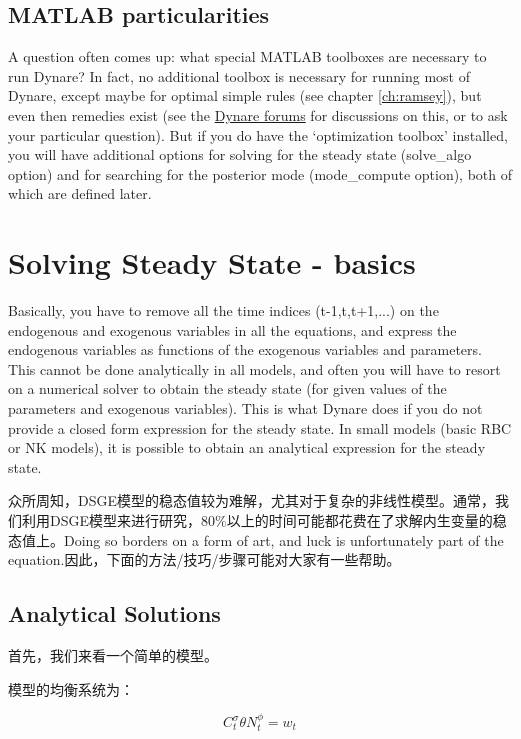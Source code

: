 \documentclass[cn,10pt,math=newtx,citestyle=gb7714-2015,bibstyle=gb7714-2015]{elegantbook}
\begin{document}
	\section{MATLAB particularities}
	
	A question often comes up: what special MATLAB toolboxes are necessary to run Dynare? In fact, no additional toolbox is necessary for running most of Dynare, except maybe for optimal simple rules (see chapter \ref{ch:ramsey}), but even then remedies exist (see the \href{http://www.dynare.org/phpBB3}{Dynare forums} for discussions on this, or to ask your particular question). But if you do have the `optimization toolbox' installed, you will have additional options for solving for the steady state (solve\_algo option) and for searching for the posterior mode (mode\_compute option), both of which are defined later. 
	
	\chapter{Solving Steady State - basics}
	Basically, you have to remove all the time indices (t-1,t,t+1,...) on the endogenous and exogenous variables in all the equations, and express the endogenous variables as functions of the exogenous variables and parameters. This cannot be done analytically in all models, and often you will have to resort on a numerical solver to obtain the steady state (for given values of the parameters and exogenous variables). This is what Dynare does if you do not provide a closed form expression for the steady state. In small models (basic RBC or NK models), it is possible to obtain an analytical expression for the steady state.
	
	众所周知，DSGE模型的稳态值较为难解，尤其对于复杂的非线性模型。通常，我们利用DSGE模型来进行研究，$80\%$以上的时间可能都花费在了求解内生变量的稳态值上。Doing so borders on a form of art, and luck is unfortunately part of the equation.因此，下面的方法/技巧/步骤可能对大家有一些帮助。
	
	\section{Analytical Solutions} \label{sec:distcn}
	
	首先，我们来看一个简单的模型。
	
	模型的均衡系统为：
	
	\begin{equation}\label{label}
		C_t^{\sigma}\theta N_t^{\phi}=w_t
	\end{equation}
	
\end{document}
